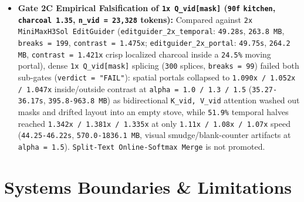 \documentclass[10pt]{article}
\begin{document}
\begin{itemize}[leftmargin=*]
\item \textbf{Gate 2C Empirical Falsification of \texttt{1x Q\_vid[mask]} (\texttt{90f} \texttt{kitchen}, \texttt{charcoal 1.35}, \texttt{n\_vid = 23,328} tokens):} Compared against \texttt{2x MiniMaxH3Sol EditGuider} (\texttt{editguider\_2x\_temporal}: \texttt{49.28s}, \texttt{263.8 MB}, \texttt{breaks = 199}, \texttt{contrast = 1.475x}; \texttt{editguider\_2x\_portal}: \texttt{49.75s}, \texttt{264.2 MB}, \texttt{contrast = 1.421x} crisp localized charcoal inside a \texttt{24.5\%} moving portal), dense \texttt{1x Q\_vid[mask]} splicing (\texttt{300} splices, \texttt{breaks = 99}) failed both sub-gates (\texttt{verdict = "FAIL"}): spatial portals collapsed to \texttt{1.090x / 1.052x / 1.047x} inside/outside contrast at \texttt{alpha = 1.0 / 1.3 / 1.5} (\texttt{35.27-36.17s}, \texttt{395.8-963.8 MB}) as bidirectional \texttt{K\_vid, V\_vid} attention washed out masks and drifted layout into an empty stove, while \texttt{51.9\%} temporal halves reached \texttt{1.342x / 1.381x / 1.335x} at only \texttt{1.11x / 1.08x / 1.07x} speed (\texttt{44.25-46.22s}, \texttt{570.0-1836.1 MB}, visual smudge/blank-counter artifacts at \texttt{alpha = 1.5}). \texttt{Split-Text Online-Softmax Merge} is not promoted.
\end{itemize}


\section{Systems Boundaries \& Limitations}
\end{document}

